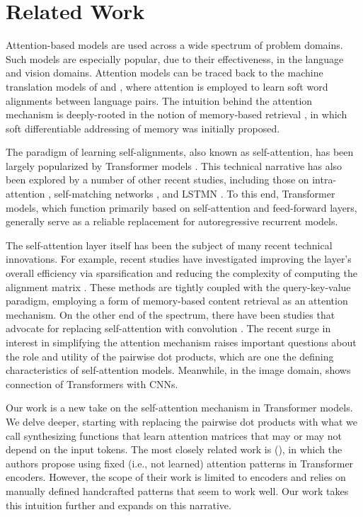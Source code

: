 \documentclass{article}
\begin{document}
\section{Related Work}
Attention-based models are used across a wide spectrum of problem domains. Such models are especially popular, due to their effectiveness, in the language and vision domains. Attention models can be traced back to the machine translation models of \citep{bahdanau2014neural} and \citep{luong2015effective}, where attention is employed to learn soft word alignments between language pairs. The intuition behind the attention mechanism is deeply-rooted in the notion of memory-based retrieval \citep{graves2014neural,weston2014memory}, in which soft differentiable addressing of memory was initially proposed. 



The paradigm of learning self-alignments, also known as self-attention, has been largely popularized by Transformer models \citep{vaswani2017attention}. This technical narrative has also been explored by a number of other recent studies, including those on intra-attention \citep{parikh2016decomposable}, self-matching networks \citep{wang2017gated}, and LSTMN \citep{cheng2016long}. To this end, Transformer models, which function primarily based on self-attention and feed-forward layers, generally serve as a reliable replacement for autoregressive recurrent models. 

The self-attention layer itself has been the subject of many recent technical innovations. For example, recent studies have investigated improving the layer's overall efficiency via sparsification and reducing the complexity of computing the alignment matrix \citep{child2019generating,kitaev2020reformer,huang2018music,tay2020sparse,Beltagy2020Longformer}. These methods are tightly coupled with the query-key-value paradigm, employing a form of memory-based content retrieval as an attention mechanism. On the other end of the spectrum, there have been studies that advocate for replacing self-attention with convolution \citep{wu2019pay}. The recent surge in interest in simplifying the attention mechanism raises important questions about the role and  utility of the pairwise dot products, which are one the defining characteristics of self-attention models. Meanwhile, in the image domain, \citep{cordonnier2019relationship} shows connection of Transformers with CNNs.

Our work is a new take on the self-attention mechanism in Transformer models. We delve deeper, starting with replacing the pairwise dot products with what we call synthesizing functions that learn attention matrices that may or may not depend on the input tokens. The most closely related work is (\citep{raganato2020fixed}), in which the authors propose using fixed (i.e., not learned) attention patterns in Transformer encoders. However, the scope of their work is limited to encoders and relies on manually defined handcrafted patterns that seem to work well. Our work takes this intuition further and expands on this narrative.
\end{document}
